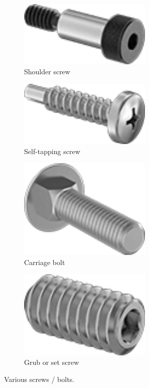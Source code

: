 \begin{figure}[H]
		\begin{subfigure}[b]{.24\linewidth}
			\includegraphics[width=0.7\textwidth]{imgs/shoulderscrew.png}
			\caption{Shoulder screw}
		\end{subfigure}\begin{subfigure}[b]{.24\linewidth}
			\includegraphics[width=0.7\textwidth]{imgs/stscrew.png}
			\caption{Self-tapping screw}
		\end{subfigure}\begin{subfigure}[b]{.24\linewidth}
			\includegraphics[width=0.7\textwidth]{imgs/carriagebolt.png}
			\caption{Carriage bolt}
		\end{subfigure}\begin{subfigure}[b]{.24\linewidth}
			\includegraphics[width=0.7\textwidth]{imgs/grubscrew.png}
			\caption{Grub or set screw}
		\end{subfigure}
		\caption{Various screws / bolts.}
	\end{figure}
	
